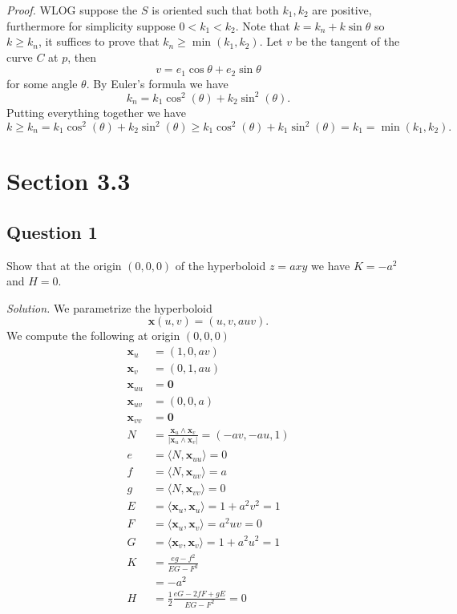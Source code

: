 \documentclass[12pt]{article}
\begin{document}
\emph{Proof.}
WLOG suppose the \(S\) is oriented such that both \(k_1, k_2\) are positive,
furthermore for simplicity suppose \(0 < k_1 < k_2\).
Note that \(k = k_n + k\sin\theta\) so \(k \geq k_n\),
it suffices to prove that \(k_n\geq \min(k_1,k_2)\).
Let \(v\) be the tangent of the curve \(C\) at \(p\), then
\[ v = e_1 \cos\theta + e_2 \sin\theta \]
for some angle \(\theta\).
By Euler's formula we have
\[ k_n = k_1 \cos^2(\theta) + k_2\sin^2(\theta). \]
Putting everything together we have
\[ k \geq k_n = k_1 \cos^2(\theta) + k_2\sin^2(\theta) \geq k_1 \cos^2(\theta) + k_1\sin^2(\theta) = k_1 = \min(k_1, k_2). \]

\section{Section 3.3}

\subsection*{Question 1}

Show that at the origin \((0,0,0)\) of the hyperboloid \(z = axy\) we have \(K = -a^2\) and \(H = 0\).

\emph{Solution.}
We parametrize the hyperboloid
\[ \mathbf{x}(u,v) = (u,v,auv). \]
We compute the following at origin \((0,0,0)\)
\begin{align*}
    \mathbf{x}_u &= (1,0,av) \\
    \mathbf{x}_v &= (0,1,au) \\
    \mathbf{x}_{uu} &= \mathbf{0} \\
    \mathbf{x}_{uv} &= (0,0,a) \\
    \mathbf{x}_{vv} &= \mathbf{0} \\
    N &= \frac{\mathbf{x}_u\wedge \mathbf{x}_v}{|\mathbf{x}_u\wedge \mathbf{x}_v|} = (-av, -au, 1) \\
    e &= \langle N,\mathbf{x}_{uu}\rangle = 0 \\
    f &= \langle N,\mathbf{x}_{uv}\rangle = a \\
    g &= \langle N,\mathbf{x}_{vv}\rangle = 0 \\
    E &= \langle \mathbf{x}_u,\mathbf{x}_u\rangle = 1 + a^2v^2 = 1\\
    F &= \langle \mathbf{x}_u,\mathbf{x}_v\rangle = a^2uv = 0\\
    G &= \langle \mathbf{x}_v,\mathbf{x}_v\rangle = 1+a^2u^2 = 1\\
    K &= \frac{eg - f^2}{EG - F^2} \\
      &= -a^2 \\
    H &= \frac12 \frac{eG - 2fF + gE}{EG - F^2} = 0
\end{align*}
\end{document}
